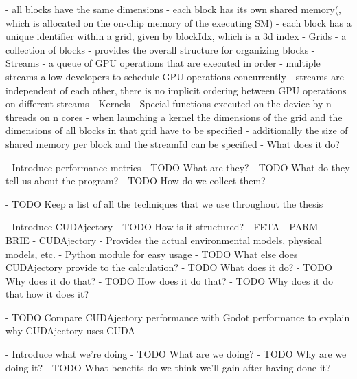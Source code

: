           - all blocks have the same dimensions
          - each block has its own shared memory(, which is allocated on the on-chip memory of the executing SM)
          - each block has a unique identifier within a grid, given by blockIdx, which is a 3d index
        - Grids
          - a collection of blocks
          - provides the overall structure for organizing blocks
        - Streams
          - a queue of GPU operations that are executed in order
          - multiple streams allow developers to schedule GPU operations concurrently
          - streams are independent of each other, there is no implicit ordering between GPU operations on different streams
        - Kernels
          - Special functions executed on the device by n threads on n cores
          - when launching a kernel the dimensions of the grid and the dimensions of all blocks in that grid have to be specified
          - additionally the size of shared memory per block and the streamId can be specified
  - What does it do?

- Introduce performance metrics
  - TODO What are they?
  - TODO What do they tell us about the program?
  - TODO How do we collect them?

- TODO Keep a list of all the techniques that we use throughout the thesis

- Introduce CUDAjectory
  - TODO How is it structured?
    - FETA
    - PARM
    - BRIE
    - CUDAjectory
      - Provides the actual environmental models, physical models, etc.
      - Python module for easy usage
      - TODO What else does CUDAjectory provide to the calculation?
  - TODO What does it do?
  - TODO Why does it do that?
  - TODO How does it do that?
  - TODO Why does it do that how it does it?

- TODO Compare CUDAjectory performance with Godot performance to explain why CUDAjectory uses CUDA

- Introduce what we're doing
  - TODO What are we doing?
  - TODO Why are we doing it?
  - TODO What benefits do we think we'll gain after having done it?


